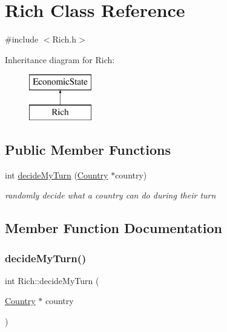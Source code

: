 \hypertarget{class_rich}{}\section{Rich Class Reference}
\label{class_rich}


{\ttfamily \#include $<$Rich.\+h$>$}

Inheritance diagram for Rich\+:\begin{figure}[H]
\begin{center}
\leavevmode
\includegraphics[height=2.000000cm]{class_rich}
\end{center}
\end{figure}
\subsection*{Public Member Functions}
\begin{DoxyCompactItemize}
\item 
int \mbox{\hyperlink{class_rich_ad954bcdfda731cf61098094a6a889a5f}{decide\+My\+Turn}} (\mbox{\hyperlink{class_country}{Country}} $\ast$country)
\begin{DoxyCompactList}\small\item\em randomly decide what a country can do during their turn \end{DoxyCompactList}\end{DoxyCompactItemize}


\subsection{Member Function Documentation}
\mbox{\label{class_rich_ad954bcdfda731cf61098094a6a889a5f}} 
\subsubsection{\texorpdfstring{decideMyTurn()}{decideMyTurn()}}
{\footnotesize\ttfamily int Rich\+::decide\+My\+Turn (\begin{DoxyParamCaption}\item[{\mbox{\hyperlink{class_country}{Country}} $\ast$}]{country }\end{DoxyParamCaption})\hspace{0.3cm}{\ttfamily [virtual]}}



